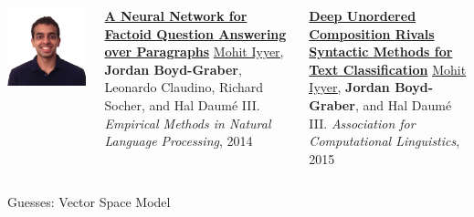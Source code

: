 \documentclass[compress]{beamer}
\newcommand{\gfxq}[2]{
\begin{center}
	\texttt{[image: qb/\#1]}
\end{center}
}
\begin{document}
\begin{frame}{}

  \begin{columns}
        \includegraphics[width=0.9\linewidth]{general_figures/mohit}
        \begin{block}{ {\bf \href{http://cs.colorado.edu/~jbg//docs/2014_emnlp_qb_rnn.pdf}{A Neural Network for Factoid Question Answering over Paragraphs}}}
\underline{\href{http://cs.umd.edu/~miyyer/}{Mohit Iyyer}}, {\bf Jordan Boyd-Graber}, Leonardo Claudino, Richard Socher, and Hal {Daum\'{e} III}.  \emph{Empirical Methods in Natural Language Processing}, 2014
        \end{block}
        
	\begin{block}{ {\bf \href{http://cs.colorado.edu/~jbg//docs/2015_acl_dan.pdf}{Deep Unordered Composition Rivals Syntactic Methods for Text Classification}} }
	\underline{\href{http://cs.umd.edu/~miyyer/}{Mohit Iyyer}}, {\bf Jordan Boyd-Graber}, and Hal {Daum\'{e} III}.  \emph{Association for Computational Linguistics}, 2015
	
	\end{block}        
        
  \end{columns}
\end{frame}


\begin{frame}{Guesses: Vector Space Model}

  \only<1>{\gfxq{unigram_models_0}{.8}}
  \only<2>{\gfxq{unigram_models_1}{.8}}
  \only<3>{\gfxq{unigram_models_2}{.8}}
  \only<4>{\gfxq{unigram_models_3}{.8}}
  \only<5>{\gfxq{unigram_models_4}{.8}}
  \only<6>{\gfxq{unigram_models_5}{.8}}
  \only<7>{\gfxq{unigram_models_6}{.8}}
  \only<8>{\gfxq{unigram_models_7}{.8}}
  \only<9>{\gfxq{unigram_models_8}{.8}}


\end{frame}
\end{document}
